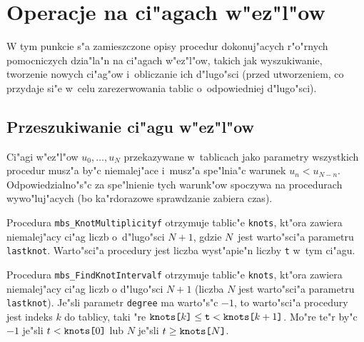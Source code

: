 

\newpage
\section{Operacje na ci"agach w"ez"l"ow}

W tym punkcie s"a zamieszczone opisy procedur dokonuj"acych r"o"rnych
pomocniczych dzia"la"n na ci"agach w"ez"l"ow, takich jak wyszukiwanie,
tworzenie nowych ci"ag"ow i~obliczanie ich d"lugo"sci (przed utworzeniem, co
przydaje si"e w~celu zarezerwowania tablic o~odpowiedniej d"lugo"sci).

\subsection{Przeszukiwanie ci"agu w"ez"l"ow}

Ci"agi w"ez"l"ow $u_0,\ldots,u_N$ przekazywane w~tablicach jako parametry
wszystkich procedur musz"a by"c niemalej"ace i~musz"a spe"lnia"c warunek
$u_n<u_{N-n}$. Odpowiedzialno"s"c za spe"lnienie tych warunk"ow spoczywa na
procedurach wywo"luj"acych (bo ka"rdorazowe sprawdzanie zabiera czas).

\vspace{\bigskipamount}
Procedura \texttt{mbs\_KnotMultiplicityf} otrzymuje
tablic"e \texttt{knots}, kt"ora zawiera niemalej"acy ci"ag liczb
o~d"lugo"sci $N+1$, gdzie $N$~jest warto"sci"a parametru \texttt{lastknot}.
Warto"sci"a procedury jest liczba wyst"apie"n liczby \texttt{t} w~tym ci"agu.


\vspace{\bigskipamount}
\begin{sloppypar}
Procedura \texttt{mbs\_FindKnotIntervalf} otrzymuje tablic"e \texttt{knots},
kt"ora zawiera niemalej"acy ci"ag liczb o d"lugo"sci $N+1$ (liczba $N$ jest
warto"sci"a parametru \texttt{lastknot}). Je"sli parametr \texttt{degree} ma
warto"s"c $-1$, to warto"sci"a procedury jest indeks $k$ do tablicy, taki "re
$\mbox{\texttt{knots[$k$]}}\leq\mbox{\texttt{t}}<\mbox{\texttt{knots[$k+1$]}}$.
Mo"re te"r by"c $-1$ je"sli $t<\mbox{\texttt{knots[$0$]}}$ lub
$N$ je"sli $t\geq\mbox{\texttt{knots[$N$]}}$.
\end{sloppypar}

